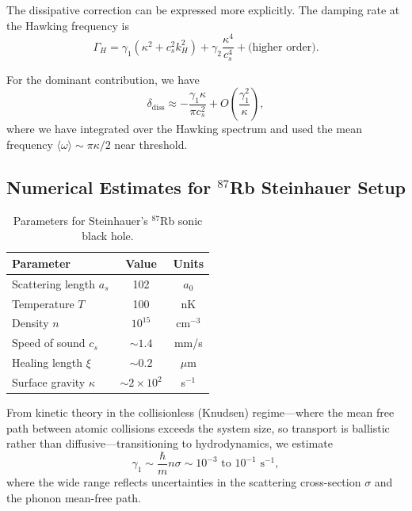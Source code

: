 \documentclass[aps,prl,twocolumn,superscriptaddress,nofootinbib,amsmath,amssymb]{revtex4-2}
\begin{document}
The dissipative correction can be expressed more explicitly. The damping rate at the Hawking frequency is
\begin{equation}
\label{eq:gamma_h_explicit}
\Gamma_H = \gamma_1 (\kappa^2 + c_s^2 k_H^2) + \gamma_2 \frac{\kappa^4}{c_s^4} + \text{(higher order)}.
\end{equation}

For the dominant contribution, we have
\begin{equation}
\label{eq:delta_diss_explicit}
\delta_{\text{diss}} \approx -\frac{\gamma_1 \kappa}{\pi c_s^2} + O\left(\frac{\gamma_1^2}{\kappa}\right),
\end{equation}
where we have integrated over the Hawking spectrum and used the mean frequency $\langle \omega \rangle \sim \pi \kappa / 2$ near threshold.

\subsection{Numerical Estimates for $^{87}$Rb Steinhauer Setup}

\begin{table}
\centering
\begin{tabular}{lcc}
\hline
Parameter & Value & Units \\
\hline
Scattering length $a_s$ & 102 & $a_0$ \\
Temperature $T$ & 100 & nK \\
Density $n$ & $10^{15}$ & cm$^{-3}$ \\
Speed of sound $c_s$ & $\sim 1.4$ & mm/s \\
Healing length $\xi$ & $\sim 0.2$ & $\mu$m \\
Surface gravity $\kappa$ & $\sim 2 \times 10^2$ & s$^{-1}$ \\
\hline
\end{tabular}
\caption{Parameters for Steinhauer's $^{87}$Rb sonic black hole.}
\label{tab:rb_params}
\end{table}

From kinetic theory in the collisionless (Knudsen) regime---where the mean free path between atomic collisions exceeds the system size, so transport is ballistic rather than diffusive---transitioning to hydrodynamics, we estimate
\begin{equation}
\gamma_1 \sim \frac{\hbar}{m} n \sigma \sim 10^{-3} \text{ to } 10^{-1} \text{ s}^{-1},
\end{equation}
where the wide range reflects uncertainties in the scattering cross-section $\sigma$ and the phonon mean-free path.
\end{document}
